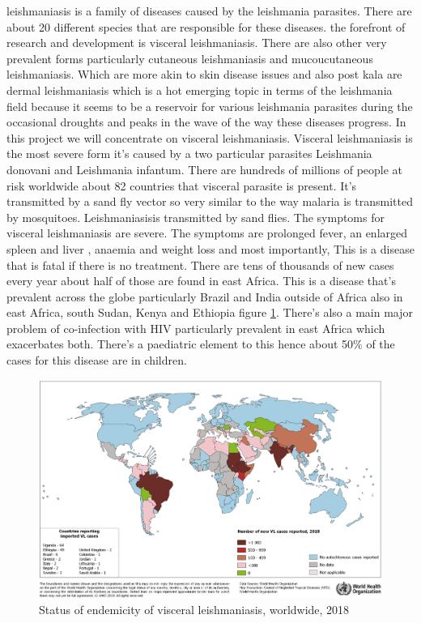 \documentclass[10pt,twocolumn,letterpaper]{article}
\begin{document}
leishmaniasis is a family of diseases caused by the leishmania parasites. There are about 20 different species that are responsible for these diseases. the forefront of research and development is visceral leishmaniasis. There are also other very prevalent forms particularly cutaneous leishmaniasis and mucoucutaneous leishmaniasis. Which are more akin to skin disease issues and also post kala are dermal leishmaniasis which is a hot emerging topic in terms of the leishmania field because it seems to be a reservoir for various leishmania  parasites during the occasional droughts and peaks in the wave of the way these diseases progress. In this project we will concentrate on visceral leishmaniasis. Visceral leishmaniasis is the most severe form it's caused by a two particular parasites Leishmania donovani and Leishmania infantum. There are hundreds of millions of people at risk worldwide about 82 countries that visceral parasite is present. It's transmitted by a sand fly vector so very similar to the way malaria is transmitted by mosquitoes. Leishmaniasisis transmitted by sand flies. The symptoms for visceral leishmaniasis are severe. The symptoms are prolonged fever, an enlarged spleen and liver , anaemia and weight loss and most importantly, This is a disease that is fatal if there is no treatment. There are tens of thousands of new cases every year about half of those are found in east Africa. This is a disease that's prevalent across the globe particularly Brazil and India outside of Africa also in east Africa, south Sudan, Kenya and Ethiopia figure \ref{fig:lesh_map1}. There's also a main major problem of co-infection with HIV particularly prevalent in east Africa which exacerbates both. There's a paediatric element to this hence about 50$\%$ of the cases for this disease are in children.


\begin{figure}[h!]
  \includegraphics[width=\linewidth]{lesh_map1.png}
  \caption{Status of endemicity of visceral leishmaniasis, worldwide, 2018}
  \label{fig:lesh_map1}
\end{figure}
\end{document}
